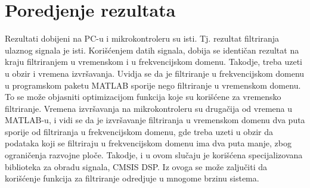 \documentclass[a4paper,12pt, projekat]{etf}
\begin{document}
\chapter{Poredjenje rezultata}

Rezultati dobijeni na PC-u i mikrokontroleru su isti. Tj. rezultat filtriranja ulaznog signala je isti.
Kori\v{s}\'{c}enjem datih signala, dobija se identi\v{c}an rezultat na kraju filtriranjem u vremenskom i
u frekvencijskom domenu. Takodje, treba uzeti u obzir i vremena izvr\v{s}avanja. Uvidja se da je filtriranje
u frekvencijskom domenu u programskom paketu MATLAB sporije nego filtriranje u vremenskom domenu. To se mo\v{z}e
objasniti optimizacijom funkcija koje su kori\v{s}\'{c}ene za vremensko filtriranje.
Vremena izvr\v{s}avanja na mikrokontroleru su druga\v{c}ija od vremena u MATLAB-u, i vidi se da je izvr\v{s}avanje
filtriranja u vremenskom domenu dva puta sporije od filtriranja u frekvencijskom domenu, gde treba uzeti u obzir da
podataka koji se filtriraju u frekvencijskom domenu ima dva puta manje, zbog ograni\v{c}enja razvojne plo\v{c}e.
Takodje, i u ovom slu\v{c}aju je kori\v{s}\'{c}ena specijalizovana biblioteka za obradu signala, CMSIS DSP.
Iz ovoga se mo\v{z}e zalju\v{c}iti da kori\v{s}\'{c}enje funkcija za filtriranje odredjuje u mnogome brzinu sistema.
\end{document}
